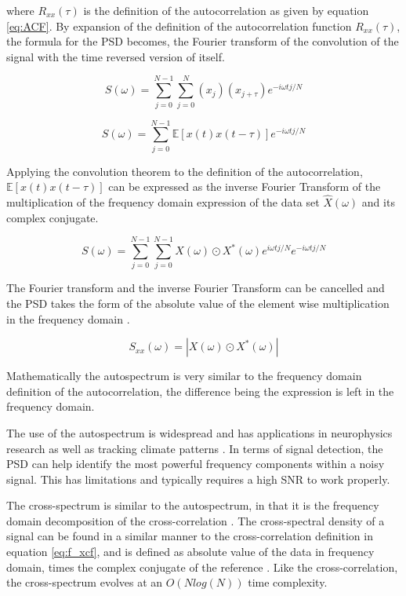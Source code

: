             where $R_{xx}(\tau)$ is the definition of the autocorrelation as given by equation \ref{eq:ACF}. By expansion of the definition of the autocorrelation function $R_{xx}(\tau)$, the formula for the PSD becomes, the Fourier transform of the convolution of the signal with the time reversed version of itself. 

            \[
                S(\omega) = \sum_{j=0}^{N-1} \sum_{j=0}^{N} (x_j) (x_{j+\tau}) e^{-i\omega t j/N}
            \]

            \[
                S(\omega) = \sum_{j=0}^{N-1} \mathbb{E}[x(t)x(t-\tau)] e^{-i\omega t j/N}
            \]

            Applying the convolution theorem \cite{harris_use_1978} to the definition of the autocorrelation, $\mathbb{E}[x(t)x(t-\tau)]$ can be expressed as the inverse Fourier Transform of the multiplication of the frequency domain expression of the data set $\hat{X}(\omega)$ and its complex conjugate.

            \[
                S(\omega) = \sum_{j=0}^{N-1} \sum_{j=0}^{N - 1} {X}(\omega) \odot {X}^*(\omega)e^{i\omega t j/N}  e^{-i\omega t j/N}
            \]

            The Fourier transform and the inverse Fourier Transform can be cancelled and the PSD takes the form of the absolute value of the element wise multiplication in the frequency domain \cite{smith_mathematics_2007}.

            \begin{equation} \label{eq:PSD}
                S_{xx}(\omega) = |X(\omega) \odot X^*(\omega)|
            \end{equation}

            Mathematically the autospectrum is very similar to the frequency domain definition of the autocorrelation, the difference being the expression is left in the frequency domain.

            The use of the autospectrum is widespread and has applications in neurophysics research as well as tracking climate patterns \cite{wen_separating_2016} \cite{storch_statistical_1999}. In terms of signal detection, the PSD can help identify the most powerful frequency components within a noisy signal. This has limitations and typically requires a high SNR to work properly.
            
            The cross-spectrum is similar to the autospectrum, in that it is the frequency domain decomposition of the cross-correlation \cite{smith_mathematics_2007}. The cross-spectral density of a signal can be found in a similar manner to the cross-correlation definition in equation \ref{eq:f_xcf}, and is defined as absolute value of the data in frequency domain, times the complex conjugate of the reference \cite{racz_multiple-resampling_2022}. Like the cross-correlation, the cross-spectrum evolves at an $O(Nlog(N))$ time complexity.


